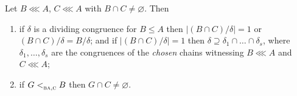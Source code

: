 \begin{longlemma}\label{lem:intersection-good}
Let $B\lll A$, $C\lll A$ with $B\cap C\neq\varnothing$. Then
\begin{enumerate}\alphlabels\tightlist
\item[\textup{(d)}] if $\delta$ is a dividing congruence for $B\le A$ then
  $|(B\cap C)/\delta|=1$ or $(B\cap C)/\delta=B/\delta$; and if
  $|(B\cap C)/\delta|=1$ then $\delta\supseteq\delta_{1}\cap\dots\cap
  \delta_{s}$, where $\delta_{1},\dots,\delta_{s}$ are the congruences of the
  \emph{chosen} chains witnessing $B\lll A$ and $C\lll A$;
\item[\textup{(s)}] if $G<_{\textup{\textsc{ba}},\textup{\textsc{c}}}^{}B$ then $G\cap C\neq\varnothing$.
\end{enumerate}
\end{longlemma}

